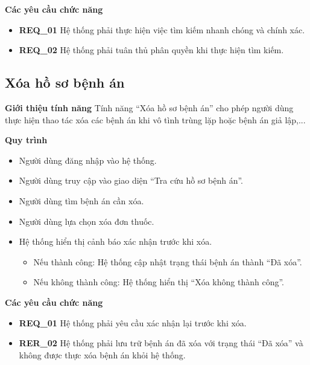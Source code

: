 \noindent \textbf{Các yêu cầu chức năng}
\begin{itemize}
    \item \textbf{REQ\_01} Hệ thống phải thực hiện việc tìm kiếm nhanh chóng và chính xác.
    \item \textbf{REQ\_02} Hệ thống phải tuân thủ phân quyền khi thực hiện tìm kiếm.
\end{itemize}

\subsection{Xóa hồ sơ bệnh án}

\noindent \textbf{Giới thiệu tính năng}
Tính năng ``Xóa hồ sơ bệnh án'' cho phép người dùng thực hiện thao tác xóa các bệnh án khi vô tình trùng lặp hoặc bệnh án giả lập,...

\noindent \textbf{Quy trình}
\begin{itemize}
    \item Người dùng đăng nhập vào hệ thống.
    \item Người dùng truy cập vào giao diện ``Tra cứu hồ sơ bệnh án''.
    \item Người dùng tìm bệnh án cần xóa.
    \item Người dùng lựa chọn xóa đơn thuốc.
    \item Hệ thống hiển thị cảnh báo xác nhận trước khi xóa.
    \begin{itemize}
        \item Nếu thành công: Hệ thống cập nhật trạng thái bệnh án thành ``Đã xóa''.
        \item Nếu không thành công: Hệ thống hiển thị ``Xóa không thành công''.
    \end{itemize}
\end{itemize}

\noindent \textbf{Các yêu cầu chức năng}
\begin{itemize}
    \item \textbf{REQ\_01} Hệ thống phải yêu cầu xác nhận lại trước khi xóa.
    \item \textbf{RER\_02} Hệ thống phải lưu trữ bệnh án đã xóa với trạng thái ``Đã xóa'' và không được thực xóa bệnh án khỏi hệ thống.
\end{itemize}